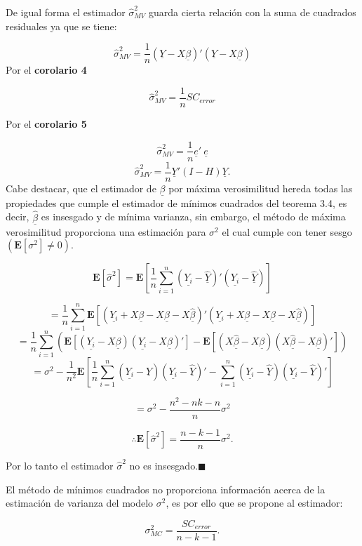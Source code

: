\documentclass[
  a4paper,
  oneside,
  openany]{book}
\begin{document}
De igual forma el estimador \(\hat{\sigma}^2_{MV}\) guarda cierta relación con la suma de cuadrados residuales ya que se tiene:

\[\hat{\sigma}^2_{MV}=\frac{1}{n}(\underline{Y}-X\underline{\beta})'(\underline{Y}-X\underline{\beta})\]
Por el \textbf{corolario 4}

\[\hat{\sigma}^2_{MV}=\frac{1}{n}SC_{error}\]

Por el \textbf{corolario 5}

\[\hat{\sigma}^2_{MV}=\frac{1}{n}\underline{e}' \ \underline{e}\]
\[\hat{\sigma}^2_{MV}=\frac{1}{n}\underline{Y}'(I-H)\underline{Y}.\]
Cabe destacar, que el estimador de \(\underline{\beta}\) por máxima verosimilitud hereda todas las propiedades que cumple el estimador de mínimos cuadrados del teorema 3.4, es decir, \(\underline{\hat{\beta}}\) es insesgado y de mínima varianza, sin embargo, el método de máxima verosimilitud proporciona una estimación para \(\sigma^2\) el cual cumple con tener sesgo \((\mathbf{E}[\sigma^2]\neq 0).\)

\[\mathbf{E}[\hat{\sigma}^2]=\mathbf{E}\left[\frac{1}{n}\sum_{i=1}^{n}(\underline{Y_{i}}-\underline{\hat{Y}})'(\underline{Y_{i}}-\underline{\hat{Y}}) \right]\]

\[=\frac{1}{n}\sum_{i=1}^{n}\mathbf{E}\left[(\underline{Y_{i}}+X\underline{\beta}-X\underline{\beta}-X\underline{\hat{\beta}})'(\underline{Y_{i}}+X\underline{\beta}-X\underline{\beta}-X\underline{\hat{\beta}}) \right]\]
\[=\frac{1}{n}\sum_{i=1}^{n}\left(\mathbf{E}[(\underline{Y_{i}}-X\underline{\beta})(\underline{Y_{i}}-X\underline{\beta})']-\mathbf{E}\left[(X\underline{\hat{\beta}}-X\underline{\beta})(X\underline{\hat{\beta}}-X\underline{\beta})'\right] \right)\]
\[=\sigma^2-\frac{1}{n^2}\mathbf{E}\left[\frac{1}{n}\sum_{i=1}^{n}(\underline{Y_{i}}-\underline{\hat{Y}})(\underline{Y_{i}}-\underline{\hat{Y}})'-\sum_{i=1}^{n}(\underline{Y_{i}}-\underline{\hat{Y}})(\underline{Y_{i}}-\underline{\hat{Y}})'\right]\]

\[=\sigma^2-\frac{n^2-nk-n}{n}\sigma^2\]

\[\therefore \mathbf{E}[\hat{\sigma}^2]=\frac{n-k-1}{n}\sigma^2.\]

Por lo tanto el estimador \(\hat{\sigma}^2\) no es insesgado.\(\blacksquare\)

El método de mínimos cuadrados no proporciona información acerca de la estimación de varianza del modelo \(\sigma^2\), es por ello que se propone al estimador:

\[\sigma^2_{MC}=\frac{SC_{error}}{n-k-1}.\]
\end{document}
